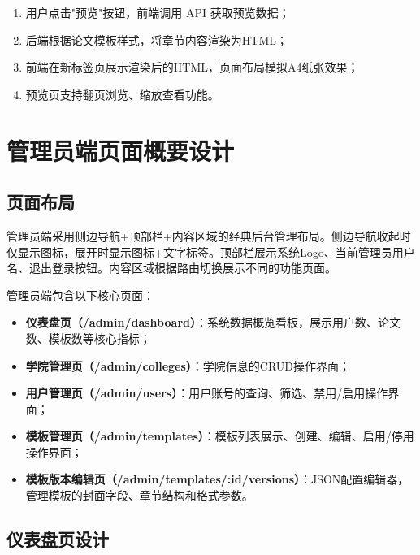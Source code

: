 \documentclass{../softeng}
\begin{document}
\begin{enumerate}
    \item 用户点击"预览"按钮，前端调用 API 获取预览数据；
    \item 后端根据论文模板样式，将章节内容渲染为HTML；
    \item 前端在新标签页展示渲染后的HTML，页面布局模拟A4纸张效果；
    \item 预览页支持翻页浏览、缩放查看功能。
\end{enumerate}

\section{管理员端页面概要设计}

\subsection{页面布局}

管理员端采用侧边导航+顶部栏+内容区域的经典后台管理布局。侧边导航收起时仅显示图标，展开时显示图标+文字标签。顶部栏展示系统Logo、当前管理员用户名、退出登录按钮。内容区域根据路由切换展示不同的功能页面。

管理员端包含以下核心页面：
\begin{itemize}
    \item \textbf{仪表盘页（/admin/dashboard）}：系统数据概览看板，展示用户数、论文数、模板数等核心指标；
    \item \textbf{学院管理页（/admin/colleges）}：学院信息的CRUD操作界面；
    \item \textbf{用户管理页（/admin/users）}：用户账号的查询、筛选、禁用/启用操作界面；
    \item \textbf{模板管理页（/admin/templates）}：模板列表展示、创建、编辑、启用/停用操作界面；
    \item \textbf{模板版本编辑页（/admin/templates/:id/versions）}：JSON配置编辑器，管理模板的封面字段、章节结构和格式参数。
\end{itemize}

\subsection{仪表盘页设计}
\end{document}
